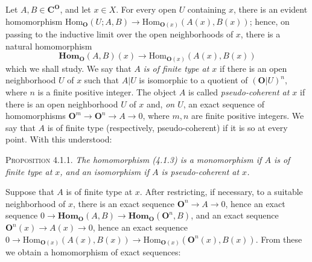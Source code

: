 Let $A,B\in \mathbf C^\mathbf O$, and let $x\in X$. For every open $U$ containing $x$, there
is an evident homomorphism
$\mathrm{Hom}_\mathbf O(U;A,B)\to\mathrm{Hom}_{\mathbf O(x)}(A(x),B(x))$; hence,
on passing to the inductive limit over the open neighborhoods of $x$, there is
a natural homomorphism
\[
\tag{4.1.3}
\mathbf{Hom}_\mathbf O(A,B)(x)\to\mathrm{Hom}_{\mathbf O(x)}(A(x),B(x))
\]
which we shall study.
We say that $A$ \textit{is of finite type at $x$} if there is an open
neighborhood $U$ of $x$ such that $A|U$ is isomorphic to a quotient of
$(\mathbf O|U)^n$, where $n$ is a finite positive integer.
The object $A$ is called \textit{pseudo-coherent at $x$} if there is an open
neighborhood $U$ of $x$ and, \textit{on $U$}, an exact sequence of
homomorphisms $\mathbf O^m\to \mathbf O^n\to A\to0$,
where $m,n$ are finite positive integers. We say that $A$ is of finite type
(respectively, pseudo-coherent) if it is so at every point. With this
understood:

\textsc{Proposition 4.1.1.} \textit{The homomorphism \textup{(4.1.3)} is a
monomorphism if $A$ is of finite type at $x$, and an isomorphism if $A$ is
pseudo-coherent at $x$.}

Suppose that $A$ is of finite type at $x$. After restricting, if necessary,
to a suitable neighborhood of $x$, there is an exact sequence
$\mathbf O^n\to A\to0$, hence an exact sequence
$0\to\mathbf{Hom}_\mathbf O(A,B)\to
\mathbf{Hom}_\mathbf O(\mathbf O^n,B)$, and an exact sequence
$\mathbf O^n(x)\to A(x)\to0$, hence an exact sequence
$0\to\mathrm{Hom}_{\mathbf O(x)}(A(x),B(x))\to
\mathrm{Hom}_{\mathbf O(x)}(\mathbf O^n(x),B(x))$. From these we obtain a homomorphism of exact
sequences:

